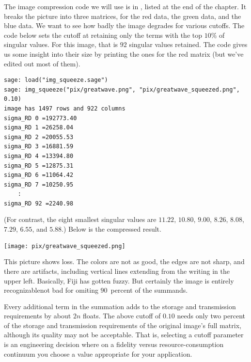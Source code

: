 The image compression code we will use is in , 
listed at the end of the chapter.
It breaks the picture into three matrices, for the red data, the 
green data, and the blue data.
We want to see how badly the image degrades for various cutoffs.
The code below sets the cutoff at retaining only the terms with
the top $10$\% of singular values.
For this image, that is $92$ singular values retained.
The code gives us some insight into their size
by printing the ones for the red matrix
(but we've edited out most of them).
\begin{lstlisting}
sage: load("img_squeeze.sage")                                 
sage: img_squeeze("pix/greatwave.png", "pix/greatwave_squeezed.png", 0.10)
image has 1497 rows and 922 columns
sigma_RD 0 =192773.40
sigma_RD 1 =26258.04
sigma_RD 2 =20055.53
sigma_RD 3 =16881.59
sigma_RD 4 =13394.80
sigma_RD 5 =12875.31
sigma_RD 6 =11064.42
sigma_RD 7 =10250.95
    :
sigma_RD 92 =2240.98
\end{lstlisting}
(For contrast, the eight smallest singular values are
  $11.22$,
  $10.80$,
  $9.00$,
  $8.26$,
  $8.08$,
  $7.29$,
  $6.55$, and
  $5.88$.)
Below is the compressed result.
\begin{center}
  \texttt{[image: pix/greatwave\_squeezed.png]}
\end{center}
This picture shows loss.
The colors are not as good, the edges are not sharp, and there are 
artifacts, including vertical lines extending from the writing in the 
upper left.
Basically, Fiji has gotten fuzzy.
But certainly the image is entirely recognizable\Dash not bad for omiting
$90$~percent of the summands.

Every additional term in the summation
adds to the storage and transmission requirements by about $2n$ floats.
The above cutoff of $0.10$ needs 
only two percent of the storage
and transmission requirements of the original image's full matrix,
although its quality may not be acceptable.
That is, selecting a cutoff parameter is an engineering decision where
on a fidelity versus resource-consumption continuum 
you choose a value appropriate for your application.
 
